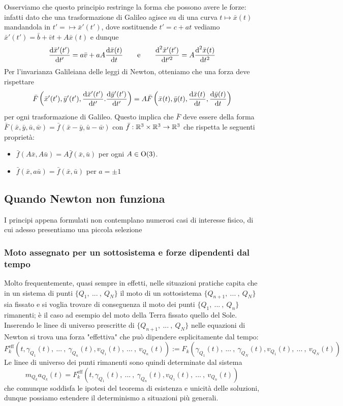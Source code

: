 \documentclass[openany]{book}
\begin{document}
Osserviamo che questo principio restringe la forma che possono avere le forze: infatti dato che una trasformazione di Galileo agisce su di una curva $t\mapsto\bar x(t)$ mandandola in $t' = \mapsto \bar x'(t') $, dove sostituende $t' = c + at$ vediamo $\bar x'(t') = \bar b + \bar v t + A\bar x(t)$ e dunque 
\[ \frac{\text{d} \bar x'(t')}{\text{d} t'} = a\bar v + a A \frac{\text{d} \bar x(t)}{\text{d} t} \qquad\text{e}\qquad \frac{\text{d}^2 \bar x'(t')}{\text{d} t'^2} = A\frac{\text{d}^2 \bar x(t)}{\text{d} t^2}\]
Per l'invarianza Galileiana delle leggi di Newton, otteniamo che una forza deve rispettare 
\[ \bar F\left( \bar x'(t'), \bar y'(t'), \frac{\text{d} \bar x'(t')}{\text{d} t'}.\frac{\text{d} \bar y'(t')}{\text{d} t'} \right) = A \bar F \left( \bar x(t), \bar y(t), \frac{\text{d} \bar x(t)}{\text{d} t},\frac{\text{d} \bar y(t)}{\text{d} t} \right)\]
per ogni trasformazione di Galileo. Questo implica che $\bar F$ deve essere della forma $\bar F(\bar x, \bar y, \bar u, \bar w) = \bar f(\bar x-\bar y, \bar u - \bar w)$ con $\bar f : \mathbb{R}^3\times \mathbb{R}^3 \to \mathbb{R}^3$ che rispetta le seguenti proprietà:\begin{itemize}
    \item $\bar f(A\bar x , A\bar u) = A\bar f(\bar x, \bar u)$ per ogni $A \in \operatorname{O}(3)$.
    \item $\bar f(\bar x, a\bar u) = \bar f(\bar x, \bar u)$ per $a =\pm 1$
\end{itemize}

\subsection{Quando Newton non funziona}

I principi appena formulati non contemplano numerosi casi di interesse fisico, di cui adesso presentiamo una piccola selezione

\newcommand\eff{\text{eff}}
\subsubsection{Moto assegnato per un sottosistema e forze dipendenti dal tempo}

Molto frequentemente, quasi sempre in effetti, nelle situazioni pratiche capita che in un sistema di punti $\{Q_1,\ ...\ ,\ Q_N\}$ il moto di un sottosistema $\{Q_{n+1},\ ...\ ,\ Q_N\}$ sia fissato e si voglia trovare di conseguenza il moto dei punti $\{Q_1,\ ...\ ,\ Q_n\}$ rimanenti; è il caso ad esempio del moto della Terra fissato quello del Sole.\\
Inserendo le linee di universo prescritte di $\{Q_{n+1},\ ...\ ,\  Q_N\}$ nelle equazioni di Newton si trova una forza "effettiva" che può dipendere esplicitamente dal tempo:
\[F^\eff_k(t, \gamma_{Q_1}(t),\ ...\ ,\  \gamma_{Q_n}(t), v_{Q_1}(t),\ ...\ ,\ v_{Q_n}(t)) := F_k(\gamma_{Q_1}(t),\ ...\ ,\  \gamma_{Q_N}(t),  v_{Q_1}(t),\ ...\ ,\ v_{Q_N}(t) )\]
Le linee di universo dei punti rimanenti sono quindi determinate dal sistema 
\[ m_{Q_k} a_{Q_k}(t) = F^\eff_k(t, \gamma_{Q_1}(t),\ ...\ ,\  \gamma_{Q_n}(t), v_{Q_1}(t),\ ...\ ,\ v_{Q_n}(t)) \]
che comunque soddisfa le ipotesi del teorema di esistenza e unicità delle soluzioni, dunque possiamo estendere il determinismo a situazioni più generali.
\end{document}
